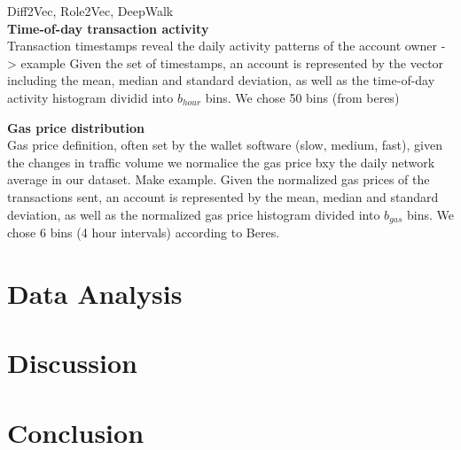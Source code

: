 \documentclass[12pt,a4paper,titlepage,oneside,english]{article}
\begin{document}
Diff2Vec, Role2Vec, DeepWalk \\

\textbf{Time-of-day transaction activity} \\
Transaction timestamps reveal the daily activity patterns of the account owner -> example
Given the set of timestamps, an account is represented by the vector including the mean, median and standard deviation, as well as the time-of-day activity histogram dividid into $b_{hour}$ bins. We chose 50 bins (from beres)

\textbf{Gas price distribution} \\
Gas price definition, often set by the wallet software (slow, medium, fast), given the changes in traffic volume we normalice the gas price bxy the daily network average in our dataset. Make example. Given the normalized gas prices of the transactions sent, an account is represented by the mean, median and standard deviation, as well as the normalized gas price histogram divided into $b_{gas}$ bins. We chose 6 bins (4 hour intervals) according to Beres.




\section{Data Analysis}





\section{Discussion}




\section{Conclusion}




\newpage
\setcounter{page}{1}
\onehalfspacing
{}



\end{document}
